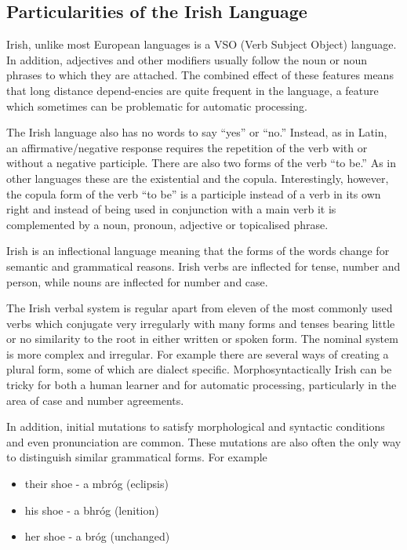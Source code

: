 \documentclass[]{../../metanetpaper}
\begin{document}
\begin{multicols}{2}
\subsection{Particularities of the Irish Language}

Irish, unlike most European languages is a VSO (Verb Subject Object) language. In addition, adjectives and other modifiers usually follow the noun or noun phrases to which they are attached. The combined effect of these features means that long distance depend-encies are quite frequent in the language, a feature which sometimes can be problematic for automatic processing.


The Irish language also has no words to say ``yes'' or ``no.'' Instead, as in Latin, an affirmative/negative response requires the repetition of the verb with or without a negative participle. There are also two forms of the verb ``to be.'' As in other languages these are the existential and the copula. Interestingly, however, the copula form of the verb ``to be'' is a participle instead of a verb in its own right and instead of being used in conjunction with a main verb it is complemented by a noun, pronoun, adjective or topicalised phrase.

Irish is an inflectional language meaning that the forms of the words change for semantic and grammatical reasons. Irish verbs are inflected for tense, number and person, while nouns are inflected for number and case.  

The Irish verbal system is regular apart from eleven of the most commonly used verbs which conjugate very irregularly with many forms and tenses bearing little or no similarity to the root in either written or spoken form. The nominal system is more complex and irregular. For example there are several ways of creating a plural form, some of which are dialect specific. Morphosyntactically Irish can be tricky for both a human learner and for automatic processing, particularly in the area of case and number agreements.

In addition, initial mutations to satisfy morphological and syntactic conditions and even pronunciation are common. These mutations are also often the only way to distinguish similar grammatical forms. For example

\begin{itemize}
\item their shoe - a mbróg (eclipsis)
\item his shoe - a bhróg (lenition)
\item her shoe - a bróg (unchanged)
\end{itemize}



\end{multicols}
\end{document}
